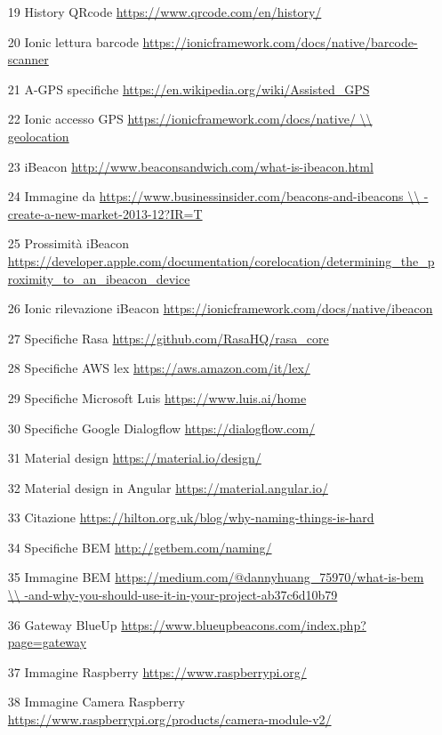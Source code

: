 \begin{itemize}
\item [19] History QRcode \url{https://www.qrcode.com/en/history/}
\item [20] Ionic lettura barcode \url{https://ionicframework.com/docs/native/barcode-scanner}
\item [21] A-GPS specifiche \url{https://en.wikipedia.org/wiki/Assisted_GPS}
\item [22] Ionic accesso GPS \url{https://ionicframework.com/docs/native/ \\
geolocation}
\item [23] iBeacon \url{http://www.beaconsandwich.com/what-is-ibeacon.html}
\item [24] Immagine da \url{https://www.businessinsider.com/beacons-and-ibeacons \\
-create-a-new-market-2013-12?IR=T}
\item [25] Prossimità iBeacon \url{https://developer.apple.com/documentation/corelocation/determining_the_proximity_to_an_ibeacon_device}
\item [26] Ionic rilevazione iBeacon \url{https://ionicframework.com/docs/native/ibeacon}
\item [27] Specifiche Rasa \url{https://github.com/RasaHQ/rasa_core}
\item [28] Specifiche AWS lex \url{https://aws.amazon.com/it/lex/}
\item [29] Specifiche Microsoft Luis \url{https://www.luis.ai/home}
\item [30] Specifiche Google Dialogflow \url{https://dialogflow.com/}
\item [31] Material design \url{https://material.io/design/}
\item [32] Material design in Angular \url{https://material.angular.io/}
\item [33] Citazione \url{https://hilton.org.uk/blog/why-naming-things-is-hard}
\item [34] Specifiche BEM \url{http://getbem.com/naming/}
\item [35] Immagine BEM \url{https://medium.com/@dannyhuang_75970/what-is-bem \\
-and-why-you-should-use-it-in-your-project-ab37c6d10b79}
\item [36] Gateway BlueUp  \url{https://www.blueupbeacons.com/index.php?page=gateway}
\item [37] Immagine Raspberry \url{https://www.raspberrypi.org/}
\item [38] Immagine Camera Raspberry \url{https://www.raspberrypi.org/products/camera-module-v2/}
\end{itemize}